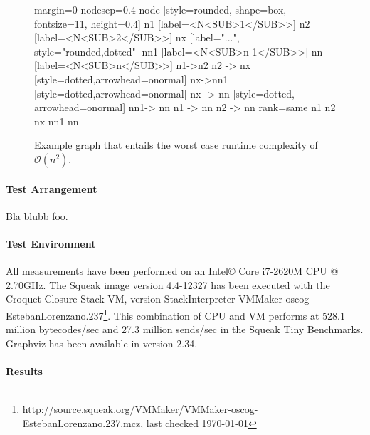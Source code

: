\begin{figure}[tb]
	\centering	
	{
		margin=0
		nodesep=0.4
		node [style=rounded, shape=box, fontsize=11, height=0.4]
		n1 [label=<N<SUB>1</SUB>>]
		n2 [label=<N<SUB>2</SUB>>]
		nx [label="...", style="rounded,dotted"]
		nn1 [label=<N<SUB>n-1</SUB>>]
		nn [label=<N<SUB>n</SUB>>]
		n1->n2
		n2 -> nx [style=dotted,arrowhead=onormal]
		nx->nn1 [style=dotted,arrowhead=onormal]
		nx -> nn [style=dotted, arrowhead=onormal]
		nn1-> nn
		n1 -> nn
		n2 -> nn
		{rank=same n1 n2 nx nn1 nn}
	}
	\caption{Example graph that entails the worst case runtime complexity of $\mathcal O(n^2)$.}
	\label{fig:graph-worst-case}
\end{figure}

\paragraph{Test Arrangement}
Bla blubb foo.

\paragraph{Test Environment} All measurements have been performed on an Intel\copyright{} Core\texttrademark{}  i7-2620M CPU @ 2.70GHz.
The Squeak image version 4.4-12327 has been executed with the Croquet Closure Stack VM, version StackInterpreter VMMaker-oscog-EstebanLorenzano.237\footnote{http://source.squeak.org/VMMaker/VMMaker-oscog-EstebanLorenzano.237.mcz, last checked \today}. This combination of CPU and VM performs at 528.1 million bytecodes/sec and 27.3 million sends/sec in the Squeak Tiny Benchmarks. Graphviz has been available in version 2.34.

\paragraph{Results}

